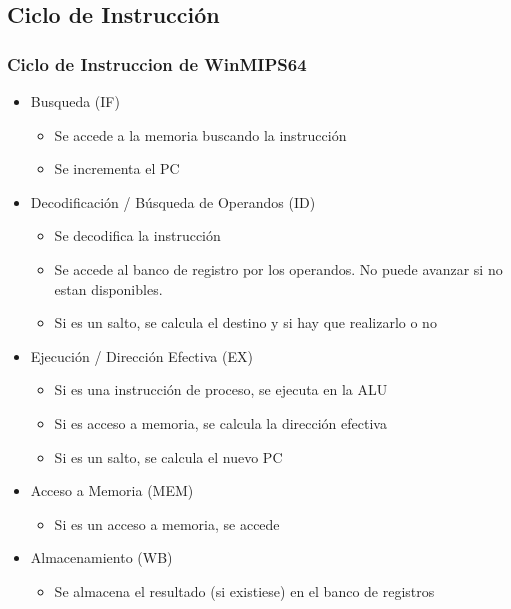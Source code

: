 \documentclass{beamer}
\begin{document}
\subsection{Ciclo de Instrucción}
\begin{frame}
\frametitle{Ciclo de Instruccion de WinMIPS64}
\begin{itemize}
\item Busqueda (IF) 
\begin{itemize}
  \item Se accede a la memoria buscando la instrucción
  \item Se incrementa el PC
\end{itemize}
\item Decodificación / Búsqueda de Operandos (ID)
\begin{itemize}
  \item Se decodifica la instrucción
  \item Se accede al banco de registro por los operandos. No puede avanzar si no estan disponibles.
  \item Si es un salto, se calcula el destino y si hay que realizarlo o no
\end{itemize}
\item Ejecución / Dirección Efectiva (EX) 
\begin{itemize}
  \item Si es una instrucción de proceso, se ejecuta en la ALU
  \item Si es acceso a memoria, se calcula la dirección efectiva
  \item Si es un salto, se calcula el nuevo PC
\end{itemize}
\item Acceso a Memoria (MEM) 
\begin{itemize}
  \item Si es un acceso a memoria, se accede
\end{itemize}
\item Almacenamiento (WB) 
\begin{itemize}
  \item Se almacena el resultado (si existiese) en el banco de registros
\end{itemize}
\end{itemize}
\end{frame}
\end{document}
